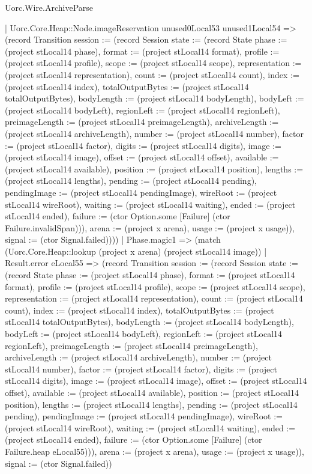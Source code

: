 \begin{lexlean}{Uorc.Wire.ArchiveParse}
\begin{semanticmodule}
{            | Uorc.Core.Heap::Node.imageReservation unused0Local53 unused1Local54 => (record Transition {session := (record Session {state := (record State {phase := (project stLocal14 phase), format := (project stLocal14 format), profile := (project stLocal14 profile), scope := (project stLocal14 scope), representation := (project stLocal14 representation), count := (project stLocal14 count), index := (project stLocal14 index), totalOutputBytes := (project stLocal14 totalOutputBytes), bodyLength := (project stLocal14 bodyLength), bodyLeft := (project stLocal14 bodyLeft), regionLeft := (project stLocal14 regionLeft), preimageLength := (project stLocal14 preimageLength), archiveLength := (project stLocal14 archiveLength), number := (project stLocal14 number), factor := (project stLocal14 factor), digits := (project stLocal14 digits), image := (project stLocal14 image), offset := (project stLocal14 offset), available := (project stLocal14 available), position := (project stLocal14 position), lengths := (project stLocal14 lengths), pending := (project stLocal14 pending), pendingImage := (project stLocal14 pendingImage), wireRoot := (project stLocal14 wireRoot), waiting := (project stLocal14 waiting), ended := (project stLocal14 ended), failure := (ctor Option.some [Failure] (ctor Failure.invalidSpan))}), arena := (project x arena), usage := (project x usage)}), signal := (ctor Signal.failed)})))
        | Phase.magic1 => (match (Uorc.Core.Heap::lookup (project x arena) (project stLocal14 image))
          | Result.error eLocal55 => (record Transition {session := (record Session {state := (record State {phase := (project stLocal14 phase), format := (project stLocal14 format), profile := (project stLocal14 profile), scope := (project stLocal14 scope), representation := (project stLocal14 representation), count := (project stLocal14 count), index := (project stLocal14 index), totalOutputBytes := (project stLocal14 totalOutputBytes), bodyLength := (project stLocal14 bodyLength), bodyLeft := (project stLocal14 bodyLeft), regionLeft := (project stLocal14 regionLeft), preimageLength := (project stLocal14 preimageLength), archiveLength := (project stLocal14 archiveLength), number := (project stLocal14 number), factor := (project stLocal14 factor), digits := (project stLocal14 digits), image := (project stLocal14 image), offset := (project stLocal14 offset), available := (project stLocal14 available), position := (project stLocal14 position), lengths := (project stLocal14 lengths), pending := (project stLocal14 pending), pendingImage := (project stLocal14 pendingImage), wireRoot := (project stLocal14 wireRoot), waiting := (project stLocal14 waiting), ended := (project stLocal14 ended), failure := (ctor Option.some [Failure] (ctor Failure.heap eLocal55))}), arena := (project x arena), usage := (project x usage)}), signal := (ctor Signal.failed)})
}
\end{semanticmodule}
\end{lexlean}

